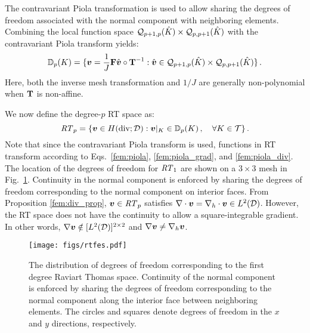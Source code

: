 \documentclass[../doc.tex]{subfiles}
\begin{document}
The contravariant Piola transformation is used to allow sharing the degrees of freedom associated with the normal component with neighboring elements. Combining the local function space $\mathcal{Q}_{p+1,p}(\hat{K})\times\mathcal{Q}_{p,p+1}(\hat{K})$ with the contravariant Piola transform yields: 
	\begin{equation}
		\mathbb{D}_p(K) = \{ \boldsymbol{v} = \frac{1}{J}\boldsymbol{\mathrm{F}}\hat{\boldsymbol{v}}\circ\boldsymbol{\mathrm{T}}^{-1} : \hat{\boldsymbol{v}} \in \mathcal{Q}_{p+1,p}(\hat{K}) \times \mathcal{Q}_{p,p+1}(\hat{K}) \} \,. 
	\end{equation}
Here, both the inverse mesh transformation and $1/J$ are generally non-polynomial when $\boldsymbol{\mathrm{T}}$ is non-affine. 

We now define the degree-$p$ RT space as: 
	\begin{equation}
		\mathit{RT}_p = \{ \boldsymbol{v} \in H(\operatorname{div};\mathcal{D}) : \boldsymbol{v}|_K \in \mathbb{D}_p(K) \,, \quad \forall K \in \mathcal{T} \} \,. 
	\end{equation}
Note that since the contravariant Piola transform is used, functions in RT transform according to Eqs.~\ref{fem:piola}, \ref{fem:piola_grad}, and \ref{fem:piola_div}. 
The location of the degrees of freedom for $\mathit{RT}_1$ are shown on a $3\times 3$ mesh in Fig.~\ref{fem:rtfes}. Continuity in the normal component is enforced by sharing the degrees of freedom corresponding to the normal component on interior faces. 
From Proposition \ref{fem:div_prop}, $\boldsymbol{v} \in \mathit{RT}_p$ satisfies $\nabla\cdot\boldsymbol{v} = \nabla_h\cdot\boldsymbol{v} \in L^2(\mathcal{D})$. However, the RT space does not have the continuity to allow a square-integrable gradient. In other words, $\nabla\boldsymbol{v} \notin [L^2(\mathcal{D})]^{2\times 2}$ and $\nabla\boldsymbol{v} \neq \nabla_h\boldsymbol{v}$. 
\begin{figure}
\centering 
\texttt{[image: figs/rtfes.pdf]}
\caption{The distribution of degrees of freedom corresponding to the first degree Raviart Thomas space. Continuity of the normal component is enforced by sharing the degrees of freedom corresponding to the normal component along the interior face between neighboring elements. The circles and squares denote degrees of freedom in the $x$ and $y$ directions, respectively. }
\label{fem:rtfes}
\end{figure}
\end{document}

